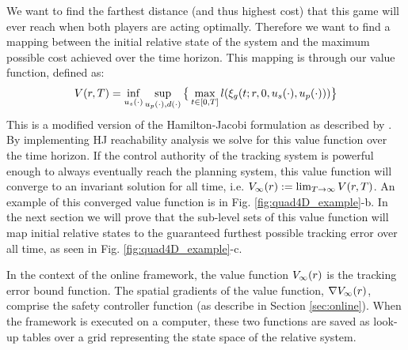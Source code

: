  We want to find the farthest distance (and thus highest cost) that this game will ever reach when both players are acting optimally. Therefore we want to find a mapping between the initial relative state of the system and the maximum possible cost achieved over the time horizon. This mapping is through our value function, defined as:
 \begin{equation}
 \begin{aligned}
 \label{eq:valfunc}
 	V(r,T)= \inf_{u_s(\cdot)} \sup_{u_p(\cdot), d(\cdot)}  \big\{\max_{t\in [0, T]} l(\xi_g(t; r, 0, u_s(\cdot), u_p(\cdot)))\big\}
 	\end{aligned}
 \end{equation} 
 This is a modified version of the Hamilton-Jacobi formulation as described by \cite{Fisac15}. By implementing HJ reachability analysis we solve for this value function over the time horizon. If the control authority of the tracking system is powerful enough to always eventually reach the planning system, this value function will converge to an invariant solution for all time, i.e. $V_\infty(r) := \lim_{T\rightarrow\infty} V(r, T)$. An example of this converged value function is in Fig. \ref{fig:quad4D_example}-b. In the next section we will prove that the sub-level sets of this value function will map initial relative states to the guaranteed furthest possible tracking error over all time, as seen in Fig. \ref{fig:quad4D_example}-c.
 
In the context of the online framework, the value function $V_\infty(r)$ is the tracking error bound function. The spatial gradients of the value function, $\nabla V_\infty(r)$, comprise the safety controller function (as describe in Section \ref{sec:online}). When the framework is executed on a computer, these two functions are saved as look-up tables over a grid representing the state space of the relative system.
 
